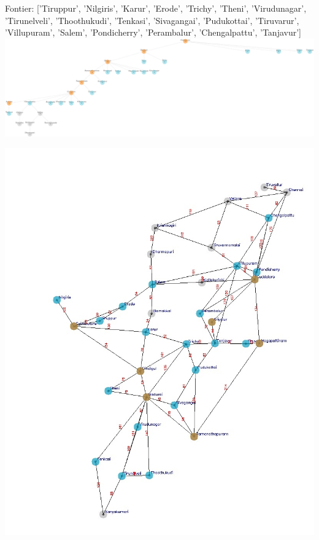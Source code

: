 \documentclass[xcolor=table]{beamer}
\begin{document}
\begin{frame}
  { \tiny Fontier: ['Tiruppur', 'Nilgiris', 'Karur', 'Erode', 'Trichy', 'Theni', 'Virudunagar', 'Tirunelveli', 'Thoothukudi', 'Tenkasi', 'Sivagangai', 'Pudukottai', 'Tiruvarur', 'Villupuram', 'Salem', 'Pondicherry', 'Perambalur', 'Chengalpattu', 'Tanjavur']}
  \includegraphics[width=1\textwidth]{../DFSNodes/9-1.png}
  \begin{center}
    \includegraphics[height=0.45\textheight]{../DFSoutput/tamilDFS7.jpg}
  \end{center}
\end{frame}
\end{document}
